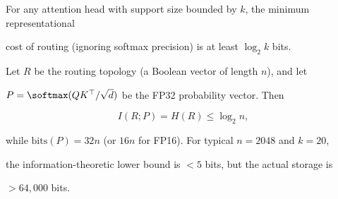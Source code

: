 \begin{lemma}





For any attention head with support size bounded by $k$, the minimum representational





cost of routing (ignoring softmax precision) is at least $\log_2 k$ bits.





\end{lemma}











\begin{theorem}





Let $R$ be the routing topology (a Boolean vector of length $n$), and let





$P = \softmax(QK^\top / \sqrt{d})$ be the FP32 probability vector. Then





\[





I(R; P) = H(R) \leq \log_2 n,





\]





while $\mathrm{bits}(P) = 32n$ (or $16n$ for FP16). For typical $n = 2048$ and $k = 20$,





the information-theoretic lower bound is $<5$ bits, but the actual storage is





$>64{,}000$ bits.





\end{theorem}











